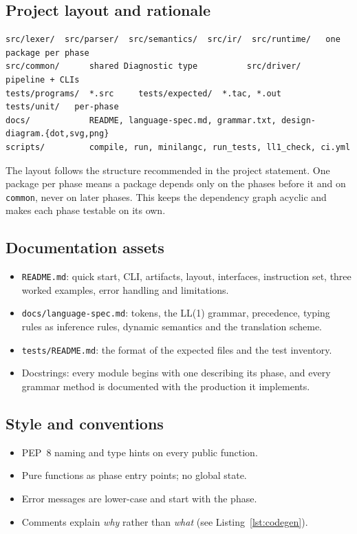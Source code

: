 \documentclass[11pt,letterpaper]{article}
\newcommand{\code}[1]{\texttt{#1}}
\begin{document}
\subsection{Project layout and rationale}
\begin{lstlisting}
src/lexer/  src/parser/  src/semantics/  src/ir/  src/runtime/   one package per phase
src/common/      shared Diagnostic type          src/driver/   pipeline + CLIs
tests/programs/  *.src     tests/expected/  *.tac, *.out     tests/unit/   per-phase
docs/            README, language-spec.md, grammar.txt, design-diagram.{dot,svg,png}
scripts/         compile, run, minilangc, run_tests, ll1_check, ci.yml
\end{lstlisting}
The layout follows the structure recommended in the project statement. One package per phase means a package depends only on the phases before it and on \code{common}, never on later phases. This keeps the dependency graph acyclic and makes each phase testable on its own.

\subsection{Documentation assets}
\begin{itemize}
  \item \code{README.md}: quick start, CLI, artifacts, layout, interfaces, instruction set, three worked examples, error handling and limitations.
  \item \code{docs/language-spec.md}: tokens, the LL(1) grammar, precedence, typing rules as inference rules, dynamic semantics and the translation scheme.
  \item \code{tests/README.md}: the format of the expected files and the test inventory.
  \item Docstrings: every module begins with one describing its phase, and every grammar method is documented with the production it implements.
\end{itemize}

\subsection{Style and conventions}
\begin{itemize}
  \item PEP~8 naming and type hints on every public function.
  \item Pure functions as phase entry points; no global state.
  \item Error messages are lower-case and start with the phase.
  \item Comments explain \emph{why} rather than \emph{what} (see Listing~\ref{lst:codegen}).
\end{itemize}
\end{document}
